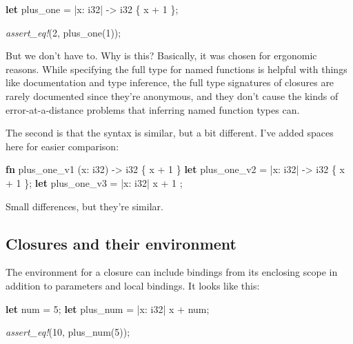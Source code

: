 \documentclass[a4paper,]{book}
\newenvironment{Shaded}{\begin{snugshade}}{\end{snugshade}}
\newcommand{\KeywordTok}[1]{\textcolor[rgb]{0.13,0.29,0.53}{\textbf{{#1}}}}
\newcommand{\DataTypeTok}[1]{\textcolor[rgb]{0.13,0.29,0.53}{{#1}}}
\newcommand{\DecValTok}[1]{\textcolor[rgb]{0.00,0.00,0.81}{{#1}}}
\newcommand{\PreprocessorTok}[1]{\textcolor[rgb]{0.56,0.35,0.01}{\textit{{#1}}}}
\newcommand{\NormalTok}[1]{{#1}}
\begin{document}
\begin{Shaded}
\begin{Highlighting}[]
\KeywordTok{let} \NormalTok{plus_one = |x: }\DataTypeTok{i32}\NormalTok{| -> }\DataTypeTok{i32} \NormalTok{\{ x + }\DecValTok{1} \NormalTok{\};}

\PreprocessorTok{assert_eq!}\NormalTok{(}\DecValTok{2}\NormalTok{, plus_one(}\DecValTok{1}\NormalTok{));}
\end{Highlighting}
\end{Shaded}

But we don't have to. Why is this? Basically, it was chosen for
ergonomic reasons. While specifying the full type for named functions is
helpful with things like documentation and type inference, the full type
signatures of closures are rarely documented since they're anonymous,
and they don't cause the kinds of error-at-a-distance problems that
inferring named function types can.

The second is that the syntax is similar, but a bit different. I've
added spaces here for easier comparison:

\begin{Shaded}
\begin{Highlighting}[]
\KeywordTok{fn}  \NormalTok{plus_one_v1   (x: }\DataTypeTok{i32}\NormalTok{) -> }\DataTypeTok{i32} \NormalTok{\{ x + }\DecValTok{1} \NormalTok{\}}
\KeywordTok{let} \NormalTok{plus_one_v2 = |x: }\DataTypeTok{i32}\NormalTok{| -> }\DataTypeTok{i32} \NormalTok{\{ x + }\DecValTok{1} \NormalTok{\};}
\KeywordTok{let} \NormalTok{plus_one_v3 = |x: }\DataTypeTok{i32}\NormalTok{|          x + }\DecValTok{1}  \NormalTok{;}
\end{Highlighting}
\end{Shaded}

Small differences, but they're similar.

\subsection{Closures and their
environment}\label{closures-and-their-environment}

The environment for a closure can include bindings from its enclosing
scope in addition to parameters and local bindings. It looks like this:

\begin{Shaded}
\begin{Highlighting}[]
\KeywordTok{let} \NormalTok{num = }\DecValTok{5}\NormalTok{;}
\KeywordTok{let} \NormalTok{plus_num = |x: }\DataTypeTok{i32}\NormalTok{| x + num;}

\PreprocessorTok{assert_eq!}\NormalTok{(}\DecValTok{10}\NormalTok{, plus_num(}\DecValTok{5}\NormalTok{));}
\end{Highlighting}
\end{Shaded}
\end{document}

